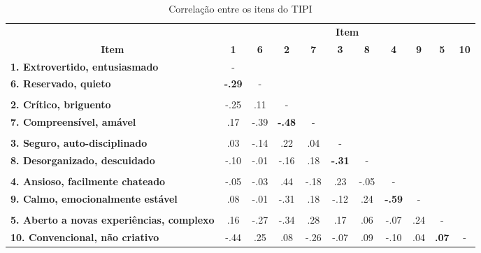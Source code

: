 \begin{sidewaystable}[ph!]
\footnotesize
\caption{\small Correlação entre os itens do TIPI}
\renewcommand{\arraystretch}{1.4} 
\centering

    \begin{tabular}{lcccccccccc}
    \toprule
          & \multicolumn{10}{c}{\textbf{Item}} \\
    \multicolumn{1}{c}{\textbf{Item}} & \textbf{1} & \textbf{6} & \textbf{2} & \textbf{7} & \textbf{3} & \textbf{8} & \textbf{4} & \textbf{9} & \textbf{5} & \textbf{10} \\
		\midrule
    \multicolumn{1}{l}{\textbf{1. Extrovertido, entusiasmado}} 						& -     &       &       &       &       &       &       &       &       &  \\
    \multicolumn{1}{l}{\textbf{6. Reservado, quieto}} 										& \textbf{-.29}	& -     &       &       &       &       &       &       &       &  \\
    \textbf{} & & & & & & & & & &  \\
    \multicolumn{1}{l}{\textbf{2. Crítico, briguento}} 										& -.25  & .11   & -     &       &       &       &       &       &       &  \\
    \multicolumn{1}{l}{\textbf{7. Compreensível, amável}} 								& .17   & -.39  & \textbf{-.48} & -     &       &       &       &       &       &  \\
    \textbf{} & & & & & & & & & &  \\
    \multicolumn{1}{l}{\textbf{3. Seguro, auto-disciplinado}} 						& .03   & -.14  & .22   & .04   & -     &       &       &       &       &  \\
    \multicolumn{1}{l}{\textbf{8. Desorganizado, descuidado}} 						& -.10  & -.01  & -.16  & .18   & \textbf{-.31} & -     &       &       &       &  \\
    \textbf{} & & & & & & & & & &  \\
    \multicolumn{1}{l}{\textbf{4. Ansioso, facilmente chateado}} 					& -.05  & -.03  & .44   & -.18  & .23   & -.05  & -     &       &       &  \\
    \multicolumn{1}{l}{\textbf{9. Calmo, emocionalmente estável}} 				& .08   & -.01  & -.31  & .18   & -.12  & .24   & \textbf{-.59} & -     &       &  \\
    \textbf{} & & & & & & & & & &  \\
    \multicolumn{1}{l}{\textbf{5. Aberto a novas experiências, complexo}} & .16   & -.27  & -.34  & .28   & .17   & .06   & -.07  & .24   & -     &  \\
    \multicolumn{1}{l}{\textbf{10. Convencional, não criativo}} 					& -.44  & .25   & .08   & -.26  & -.07  & .09   & -.10  & .04   & \textbf{.07} & - \\
    

\end{tabular}
\end{sidewaystable}
